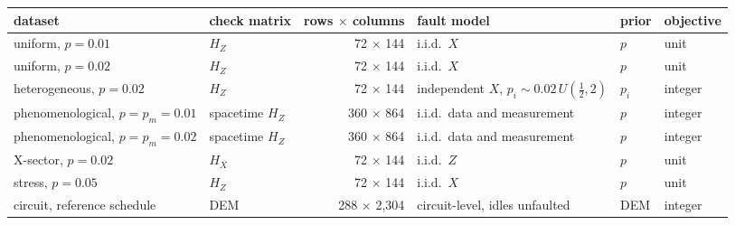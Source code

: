 \begin{tabular}{@{}llrlll@{}}
\toprule
dataset & check matrix & rows $\times$ columns & fault model & prior & objective \\
\midrule
uniform, $p=0.01$ & $H_Z$ & 72 $\times$ 144 & i.i.d.\ $X$ & $p$ & unit \\
uniform, $p=0.02$ & $H_Z$ & 72 $\times$ 144 & i.i.d.\ $X$ & $p$ & unit \\
heterogeneous, $p=0.02$ & $H_Z$ & 72 $\times$ 144 & independent $X$, $p_i\sim 0.02\,U(\tfrac12,2)$ & $p_i$ & integer \\
phenomenological, $p=p_m=0.01$ & spacetime $H_Z$ & 360 $\times$ 864 & i.i.d.\ data and measurement & $p$ & integer \\
phenomenological, $p=p_m=0.02$ & spacetime $H_Z$ & 360 $\times$ 864 & i.i.d.\ data and measurement & $p$ & integer \\
X-sector, $p=0.02$ & $H_X$ & 72 $\times$ 144 & i.i.d.\ $Z$ & $p$ & unit \\
stress, $p=0.05$ & $H_Z$ & 72 $\times$ 144 & i.i.d.\ $X$ & $p$ & unit \\
circuit, reference schedule & DEM & 288 $\times$ 2{,}304 & circuit-level, idles unfaulted & DEM & integer \\
\bottomrule
\end{tabular}

